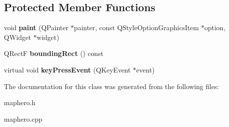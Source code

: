 \subsection*{Protected Member Functions}
\begin{DoxyCompactItemize}
\item 
\hypertarget{class_map_hero_a001330799c5a8c83f9689f87c0e4188e}{void {\bfseries paint} (Q\-Painter $\ast$painter, const Q\-Style\-Option\-Graphics\-Item $\ast$option, Q\-Widget $\ast$widget)}\label{class_map_hero_a001330799c5a8c83f9689f87c0e4188e}

\item 
\hypertarget{class_map_hero_a45109e2e0ed082a5df0ff820c9c7d5bb}{Q\-Rect\-F {\bfseries bounding\-Rect} () const }\label{class_map_hero_a45109e2e0ed082a5df0ff820c9c7d5bb}

\item 
\hypertarget{class_map_hero_ae0a3357463f62642da708cad22f7bf4c}{virtual void {\bfseries key\-Press\-Event} (Q\-Key\-Event $\ast$event)}\label{class_map_hero_ae0a3357463f62642da708cad22f7bf4c}

\end{DoxyCompactItemize}


The documentation for this class was generated from the following files\-:\begin{DoxyCompactItemize}
\item 
maphero.\-h\item 
maphero.\-cpp\end{DoxyCompactItemize}
